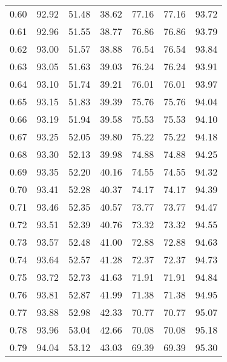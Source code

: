 \begin{tabular}{|c|c|c|c|c|c|c|}
      0.60 &     92.92 &     51.48 &      38.62 &   77.16 &      77.16 &         93.72 \\
      0.61 &     92.96 &     51.55 &      38.77 &   76.86 &      76.86 &         93.79 \\
      0.62 &     93.00 &     51.57 &      38.88 &   76.54 &      76.54 &         93.84 \\
      0.63 &     93.05 &     51.63 &      39.03 &   76.24 &      76.24 &         93.91 \\
      0.64 &     93.10 &     51.74 &      39.21 &   76.01 &      76.01 &         93.97 \\
      0.65 &     93.15 &     51.83 &      39.39 &   75.76 &      75.76 &         94.04 \\
      0.66 &     93.19 &     51.94 &      39.58 &   75.53 &      75.53 &         94.10 \\
      0.67 &     93.25 &     52.05 &      39.80 &   75.22 &      75.22 &         94.18 \\
      0.68 &     93.30 &     52.13 &      39.98 &   74.88 &      74.88 &         94.25 \\
      0.69 &     93.35 &     52.20 &      40.16 &   74.55 &      74.55 &         94.32 \\
      0.70 &     93.41 &     52.28 &      40.37 &   74.17 &      74.17 &         94.39 \\
      0.71 &     93.46 &     52.35 &      40.57 &   73.77 &      73.77 &         94.47 \\
      0.72 &     93.51 &     52.39 &      40.76 &   73.32 &      73.32 &         94.55 \\
      0.73 &     93.57 &     52.48 &      41.00 &   72.88 &      72.88 &         94.63 \\
      0.74 &     93.64 &     52.57 &      41.28 &   72.37 &      72.37 &         94.73 \\
      0.75 &     93.72 &     52.73 &      41.63 &   71.91 &      71.91 &         94.84 \\
      0.76 &     93.81 &     52.87 &      41.99 &   71.38 &      71.38 &         94.95 \\
      0.77 &     93.88 &     52.98 &      42.33 &   70.77 &      70.77 &         95.07 \\
      0.78 &     93.96 &     53.04 &      42.66 &   70.08 &      70.08 &         95.18 \\
      0.79 &     94.04 &     53.12 &      43.03 &   69.39 &      69.39 &         95.30 \\

\end{tabular}
